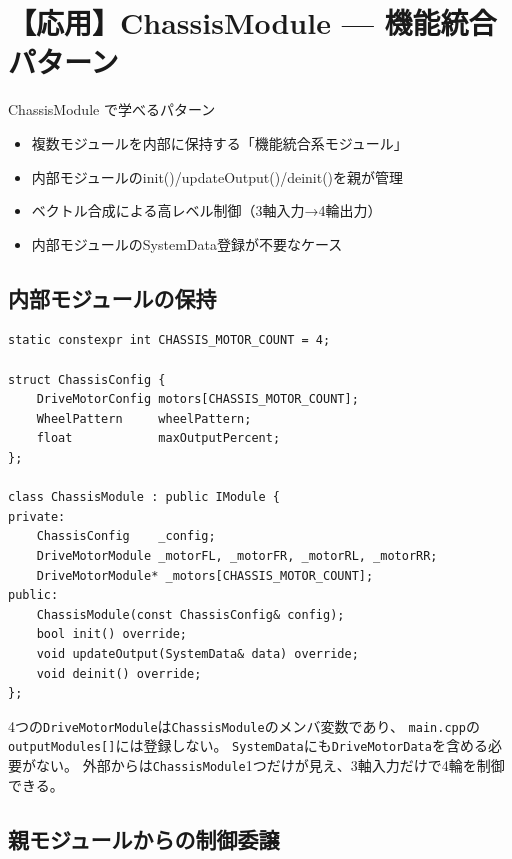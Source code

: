 \section{【応用】ChassisModule — 機能統合パターン}

\begin{patternbox}{ChassisModule で学べるパターン}
\begin{itemize}
    \item 複数モジュールを内部に保持する「機能統合系モジュール」
    \item 内部モジュールのinit()/updateOutput()/deinit()を親が管理
    \item ベクトル合成による高レベル制御（3軸入力→4輪出力）
    \item 内部モジュールのSystemData登録が不要なケース
\end{itemize}
\end{patternbox}

\subsection{内部モジュールの保持}

\begin{lstlisting}[style=cppstyle, caption={ChassisModule.h — 内部にDriveMotorModuleを4つ保持}]
static constexpr int CHASSIS_MOTOR_COUNT = 4;

struct ChassisConfig {
    DriveMotorConfig motors[CHASSIS_MOTOR_COUNT];
    WheelPattern     wheelPattern;
    float            maxOutputPercent;
};

class ChassisModule : public IModule {
private:
    ChassisConfig    _config;
    DriveMotorModule _motorFL, _motorFR, _motorRL, _motorRR;
    DriveMotorModule* _motors[CHASSIS_MOTOR_COUNT];
public:
    ChassisModule(const ChassisConfig& config);
    bool init() override;
    void updateOutput(SystemData& data) override;
    void deinit() override;
};
\end{lstlisting}

\begin{pointbox}[内部モジュールはIModule配列に登録しない]
4つの\texttt{DriveMotorModule}は\texttt{ChassisModule}のメンバ変数であり、
\texttt{main.cpp}の\texttt{outputModules[]}には登録しない。
\texttt{SystemData}にも\texttt{DriveMotorData}を含める必要がない。
外部からは\texttt{ChassisModule}1つだけが見え、3軸入力だけで4輪を制御できる。
\end{pointbox}

\subsection{親モジュールからの制御委譲}

